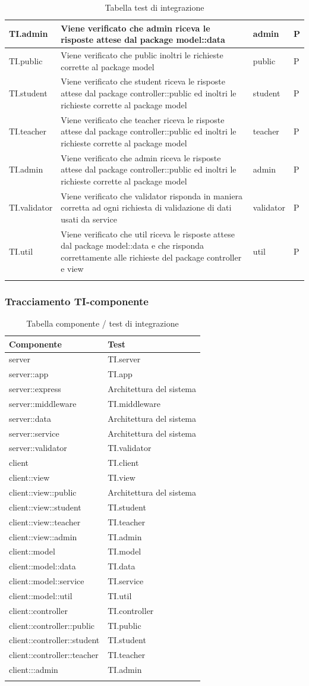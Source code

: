 \documentclass[12pt,a4paper]{article}
\begin{document}
\begin{longtable}{l p{8cm} l l}
		\midrule
		TI.admin & Viene verificato che admin riceva le risposte attese dal package model::data & admin & P\tabularnewline
		\midrule
		TI.public & Viene verificato che public inoltri le richieste corrette al package model & public & P\tabularnewline
		\midrule
		TI.student & Viene verificato che student riceva le risposte attese dal package controller::public ed inoltri le richieste corrette al package model & student & P\tabularnewline
		\midrule
		TI.teacher & Viene verificato che teacher riceva le risposte attese dal package controller::public ed inoltri le richieste corrette al package model & teacher & P\tabularnewline
		\midrule
		TI.admin & Viene verificato che admin riceva le risposte attese dal package controller::public ed inoltri le richieste corrette al package model & admin & P\tabularnewline
		\midrule
		TI.validator & Viene verificato che validator risponda in maniera corretta ad ogni richiesta di validazione di dati usati da service & validator & P\tabularnewline
		\midrule
		TI.util & Viene verificato che util riceva le risposte attese dal package model::data e che risponda correttamente alle richieste del package controller e view & util & P\tabularnewline
		\midrule
		\caption{Tabella test di integrazione} \tabularnewline
	\end{longtable}
	\subsubsection{Tracciamento TI-componente}
	\begin{longtable}{l l}
		\midrule
		\textbf{Componente} & \textbf{Test}\tabularnewline
		\midrule
		\midrule
		server & TI.server\tabularnewline
		\midrule
		server::app & TI.app\tabularnewline
		\midrule
		server::express & Architettura del sistema\tabularnewline
		\midrule
		server::middleware & TI.middleware\tabularnewline
		\midrule
		server::data & Architettura del sistema\tabularnewline
		\midrule
		server::service & Architettura del sistema\tabularnewline
		\midrule
		server::validator & TI.validator\tabularnewline
		\midrule
		client & TI.client\tabularnewline
		\midrule
		client::view & TI.view\tabularnewline
		\midrule
		client::view::public & Architettura del sistema\tabularnewline
		\midrule
		client::view::student & TI.student\tabularnewline
		\midrule
		client::view::teacher & TI.teacher\tabularnewline
		\midrule
		client::view::admin & TI.admin\tabularnewline
		\midrule
		client::model & TI.model\tabularnewline
		\midrule
		client::model::data & TI.data\tabularnewline
		\midrule
		client::model::service & TI.service\tabularnewline
		\midrule
		client::model::util & TI.util\tabularnewline
		\midrule
		client::controller & TI.controller\tabularnewline
		\midrule
		client::controller::public & TI.public\tabularnewline
		\midrule
		client::controller::student & TI.student\tabularnewline
		\midrule
		client::controller::teacher & TI.teacher\tabularnewline
		\midrule
		client:::admin & TI.admin\tabularnewline
		\midrule
		\caption{Tabella componente / test di integrazione} \tabularnewline
	\end{longtable}
\end{document}
